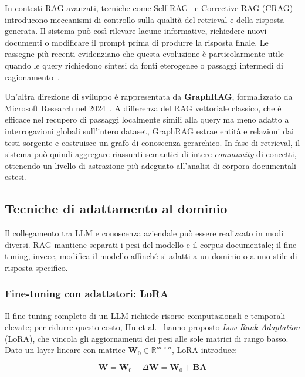 In contesti RAG avanzati, tecniche come Self-RAG~\cite{asai2023selfrag} e
Corrective RAG (CRAG)~\cite{yan2024corrective} introducono meccanismi di
controllo sulla qualità del retrieval e della risposta generata. Il sistema può
così rilevare lacune informative, richiedere nuovi documenti o modificare il
prompt prima di produrre la risposta finale. Le rassegne più recenti
evidenziano che questa evoluzione è particolarmente utile quando le query
richiedono sintesi da fonti eterogenee o passaggi intermedi di
ragionamento~\cite{gao2024retrieval}.

Un'altra direzione di sviluppo è rappresentata da \textbf{GraphRAG},
formalizzato da Microsoft Research nel 2024~\cite{edge2024graphrag}. A
differenza del RAG vettoriale classico, che è efficace nel recupero di passaggi
localmente simili alla query ma meno adatto a interrogazioni globali sull'intero
dataset, GraphRAG estrae entità e relazioni dai testi sorgente e costruisce un
grafo di conoscenza gerarchico. In fase di retrieval, il sistema può quindi
aggregare riassunti semantici di intere \textit{community} di concetti,
ottenendo un livello di astrazione più adeguato all'analisi di corpora
documentali estesi.

\subsection{Tecniche di adattamento al dominio}
\label{subsec:domain_adaptation}

Il collegamento tra LLM e conoscenza aziendale può essere realizzato in modi
diversi. RAG mantiene separati i pesi del modello e il corpus documentale;
il fine-tuning, invece, modifica il modello affinché si adatti a un dominio o a
uno stile di risposta specifico.

\subsubsection{Fine-tuning con adattatori: LoRA}

Il fine-tuning completo di un LLM richiede risorse computazionali e temporali elevate; per
ridurre questo costo, Hu et al.~\cite{hu2022lora} hanno proposto
\textit{Low-Rank Adaptation} (LoRA), che vincola gli aggiornamenti dei pesi alle sole
matrici di rango basso. Dato un layer lineare con matrice
$\mathbf{W}_0 \in \mathbb{R}^{m \times n}$, LoRA introduce:

\begin{equation}
  \mathbf{W} = \mathbf{W}_0 + \Delta\mathbf{W} = \mathbf{W}_0 + \mathbf{B}\mathbf{A}
  \label{eq:lora}
\end{equation}

